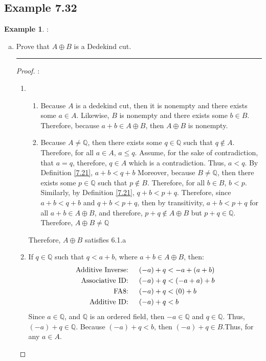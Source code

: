 \documentclass[openany, amssymb, psamsfonts]{amsart}
\newcommand{\bbQ}{\mathbb{Q}}
\theoremstyle{definition}
\newtheorem{exmp}{Example}[section]
\numberwithin{equation}{section}
\begin{document}
\subsection*{Example 7.32}
\begin{exmp}:\\
\label{7.32}
	\begin{enumerate}[(a)]
		\item Prove that $A \oplus B$ is a Dedekind cut.
  \vspace{4pt}     \hrule   \vspace{4pt}
  \begin{proof}:\\
\begin{enumerate}
    \item 
    \begin{enumerate}
        \item Because $A$ is a dedekind cut, then it is nonempty and there exists some $a\in A$. Likewise, $B$ is nonempty and there exists some $b\in B$. Therefore, because $a+b \in A\oplus B$, then $A\oplus B$ is nonempty.
        \item Because $A\neq \bbQ$, then there exists some $q\in \bbQ$ such that $q\notin A$. Therefore, for all $a\in A$, $a\leq q$. Assume, for the sake of contradiction, that $a=q$, therefore, $q\in A$ which is a contradiction. Thus, $a<q$. By Definition \ref{7.21}, $a+b<q+b$
        Moreover, because $B\neq \bbQ$, then there exists some $p\in \bbQ$ such that $p\notin B$. Therefore, for all $b\in B$, $b<p$. Similarly, by Definition \ref{7.21}, $q+b<p+q$. Therefore, since $a+b<q+b$ and $q+b<p+q$, then by transitivity, $a+b < p+q$ for all $a+b \in A\oplus B$, and therefore, $p+q\notin A\oplus B$ but $p+q\in \bbQ$. Therefore, $A\oplus B \neq \bbQ$
    \end{enumerate}
    Therefore, $A\oplus B$ satisfies 6.1.a
    \item If $q\in \bbQ$ such that $q<a+b$, where $a+b\in A\oplus B$, then:
    \begin{align*}
        \text{Additive Inverse:}\indent (-a)+q&<-a+(a+b)\\
        \text{Associative ID:}\indent (-a)+q&<(-a+a)+b\\
        \text{FA8:}\indent (-a)+q&<(0)+b\\
        \text{Additive ID:}\indent (-a)+q&<b
    \end{align*}
    Since $a\in \bbQ$, and $\bbQ$ is an ordered field, then $-a\in \bbQ$ and $q\in \bbQ$. Thus, $(-a)+q\in \bbQ$. Because $(-a)+q<b$, then $(-a)+q\in B$.Thus, for any $a\in A$.

\end{enumerate}
\end{proof}
\end{enumerate}
\end{exmp}
\end{document}
